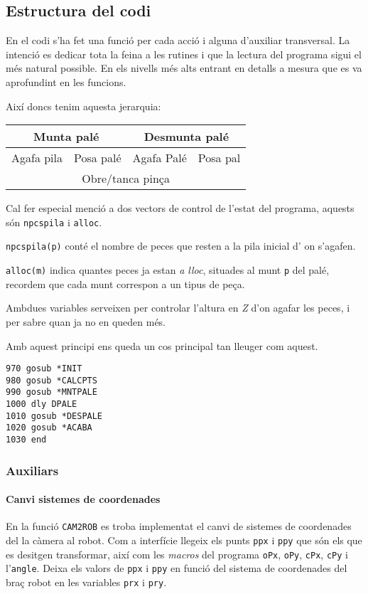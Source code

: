 \subsection{Estructura del codi}
En el codi s'ha fet una funció per cada acció i alguna d'auxiliar transversal.
La intenció es dedicar tota la feina a les rutines i que la lectura del
programa sigui el més natural possible. En els nivells més alts entrant en
detalls a mesura que es va aprofundint en les funcions.

Així doncs tenim aquesta jerarquia:

\begin{center}
\begin{tabular}{|l|l|l|l|}
\hline
\multicolumn{2}{|c|}{Munta palé} & \multicolumn{2}{|c|}{Desmunta palé}\\
\hline
Agafa pila & Posa palé & Agafa Palé & Posa pal\\
\hline
\multicolumn{4}{|c|}{Obre/tanca pinça}\\
\hline
\end{tabular}
\end{center}


Cal fer especial menció a dos vectors de control de l'estat del programa,
aquests són \texttt{npcspila} i \texttt{alloc}.

\texttt{npcspila(p)} conté el nombre de peces que resten a la pila inicial d'
on s'agafen.

\texttt{alloc(m)} indica quantes peces ja estan \emph{a lloc}, situades al munt
\texttt{p} del palé, recordem que cada munt correspon a un tipus de peça.

Ambdues variables serveixen per controlar l'altura en \emph{Z} d'on agafar les
peces, i per sabre quan ja no en queden més.

Amb aquest principi ens queda un cos principal tan lleuger com aquest.
\begin{verbatim}
970 gosub *INIT
980 gosub *CALCPTS
990 gosub *MNTPALE
1000 dly DPALE
1010 gosub *DESPALE
1020 gosub *ACABA
1030 end
\end{verbatim}

\subsubsection{Auxiliars}
\paragraph{Canvi sistemes de coordenades}\label{cam2rob}
En la funció \texttt{CAM2ROB} es troba implementat el canvi de sistemes
de coordenades del la càmera al robot.
Com a interfície llegeix els punts \texttt{ppx} i \texttt{ppy} que són els que es desitgen
transformar, així com les \emph{macros} del programa \texttt{oPx}, \texttt{oPy},
\texttt{cPx}, \texttt{cPy} i l'\texttt{angle}. Deixa els valors de
\texttt{ppx} i \texttt{ppy} en funció del sistema de coordenades del braç
robot en les variables \texttt{prx} i \texttt{pry}.

